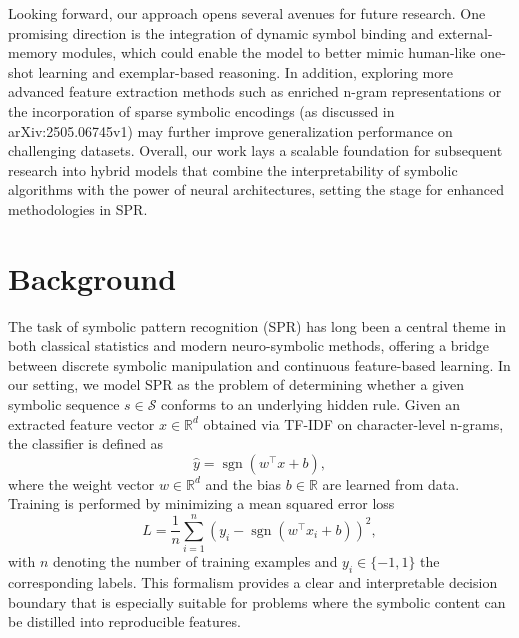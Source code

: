 \documentclass{article}
\begin{document}
Looking forward, our approach opens several avenues for future research. One promising direction is the integration of dynamic symbol binding and external-memory modules, which could enable the model to better mimic human-like one-shot learning and exemplar-based reasoning. In addition, exploring more advanced feature extraction methods such as enriched n-gram representations or the incorporation of sparse symbolic encodings (as discussed in arXiv:2505.06745v1) may further improve generalization performance on challenging datasets. Overall, our work lays a scalable foundation for subsequent research into hybrid models that combine the interpretability of symbolic algorithms with the power of neural architectures, setting the stage for enhanced methodologies in SPR.

\section{Background}
The task of symbolic pattern recognition (SPR) has long been a central theme in both classical statistics and modern neuro-symbolic methods, offering a bridge between discrete symbolic manipulation and continuous feature-based learning. In our setting, we model SPR as the problem of determining whether a given symbolic sequence \( s \in \mathcal{S} \) conforms to an underlying hidden rule. Given an extracted feature vector \( x \in \mathbb{R}^d \) obtained via TF-IDF on character-level n-grams, the classifier is defined as 
\[
\hat{y} = \operatorname{sgn}(w^\top x + b),
\]
where the weight vector \( w \in \mathbb{R}^d \) and the bias \( b \in \mathbb{R} \) are learned from data. Training is performed by minimizing a mean squared error loss
\[
L = \frac{1}{n}\sum_{i=1}^{n} \left(y_i - \operatorname{sgn}(w^\top x_i + b)\right)^2,
\]
with \( n \) denoting the number of training examples and \( y_i \in \{-1, 1\} \) the corresponding labels. This formalism provides a clear and interpretable decision boundary that is especially suitable for problems where the symbolic content can be distilled into reproducible features.
\end{document}
